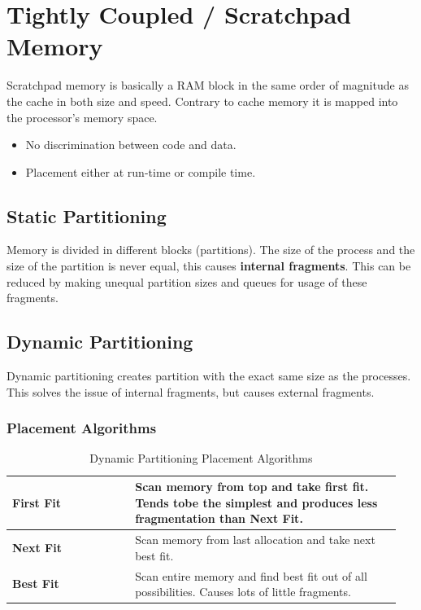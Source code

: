 \section{Tightly Coupled / Scratchpad Memory }
	Scratchpad memory is basically a RAM block in the same order of magnitude as the cache in both size and speed. Contrary to cache memory it is mapped into the processor's memory space.
	
	\begin{itemize}
	  \item No discrimination between code and data.
	  \item Placement either at run-time or compile time.
	\end{itemize}
	
	\subsection{Static Partitioning }
		Memory is divided in different blocks (partitions). The size of the process and the size of the partition is never equal, this causes \textbf{internal fragments}. This can be reduced by making unequal partition sizes and queues for usage of these fragments.
	
	\subsection{Dynamic Partitioning }
		Dynamic partitioning creates partition with the exact same size as the processes. This solves the issue of internal fragments, but causes external fragments.
		
		\subsubsection{Placement Algorithms}
			\begin{table}[H]
				\centering
				\begin{tabular}{|p{0.3\linewidth}|p{0.65\linewidth}|}
					\hline
					\textbf{First Fit}
						& Scan memory from top and take first fit. Tends tobe the simplest and produces less fragmentation than \textbf{Next Fit}.\\
					\hline
					\textbf{Next Fit}
						& Scan memory from last allocation and take next best fit.\\
					\hline
					\textbf{Best Fit}
						& Scan entire memory and find best fit out of all possibilities. Causes lots of little fragments.\\
					\hline	
				\end{tabular}
				\caption{Dynamic Partitioning Placement Algorithms}
			\end{table}		
			
